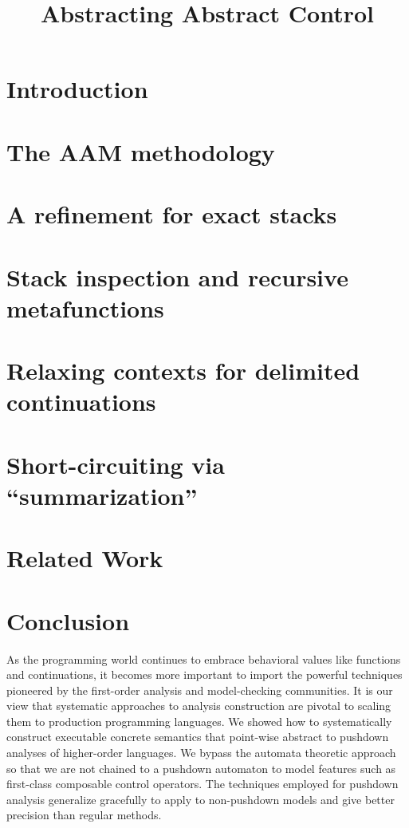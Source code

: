 \documentclass[preprint]{sigplanconf}
\title{Abstracting Abstract Control}
\begin{document}
\maketitle


\begin{abstract}

\end{abstract}

\section{Introduction}

\section{The AAM methodology}

\section{A refinement for exact stacks}\label{sec:pushdown}

\section{Stack inspection and recursive metafunctions}

\section{Relaxing contexts for delimited continuations}\label{sec:delim}

\section{Short-circuiting via ``summarization''}\label{sec:memo}

\section{Related Work}

\section{Conclusion}
As the programming world continues to embrace behavioral values like functions and continuations, it becomes more important to import the powerful techniques pioneered by the first-order analysis and model-checking communities.
%
It is our view that systematic approaches to analysis construction are pivotal to scaling them to production programming languages.
%
We showed how to systematically construct executable concrete semantics that point-wise abstract to pushdown analyses of higher-order languages.
%
We bypass the automata theoretic approach so that we are not chained to a pushdown automaton to model features such as first-class composable control operators.
%
The techniques employed for pushdown analysis generalize gracefully to apply to non-pushdown models and give better precision than regular methods.

\balance


\end{document}
